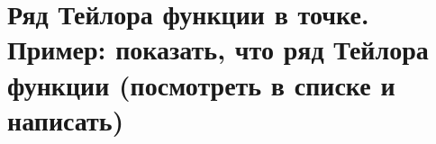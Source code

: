 {
	\section{Ряд Тейлора функции в точке. Пример: показать, что ряд Тейлора функции (посмотреть в списке и написать)}

	\newpage
}